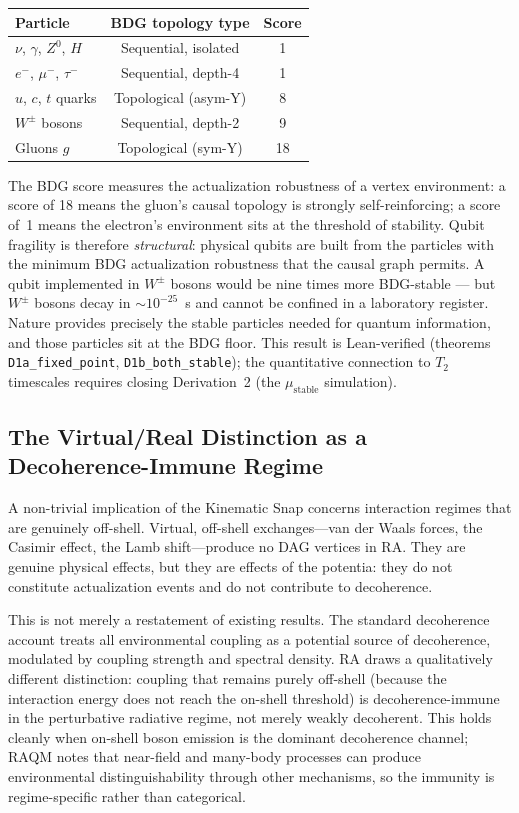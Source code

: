 \documentclass[11pt,a4paper]{article}
\theoremstyle{plain}
\theoremstyle{definition}
\theoremstyle{remark}
\begin{document}
\begin{center}
\renewcommand{\arraystretch}{1.2}
\begin{tabular}{lcc}
\toprule
Particle & BDG topology type & Score \\
\midrule
$\nu$, $\gamma$, $Z^0$, $H$ & Sequential, isolated & 1 \\
$e^-$, $\mu^-$, $\tau^-$ & Sequential, depth-4 & 1 \\
$u$, $c$, $t$ quarks & Topological (asym-Y) & 8 \\
$W^{\pm}$ bosons & Sequential, depth-2 & 9 \\
Gluons $g$ & Topological (sym-Y) & 18 \\
\bottomrule
\end{tabular}
\end{center}

The BDG score measures the actualization robustness of a vertex environment:
a score of 18 means the gluon's causal topology is strongly self-reinforcing;
a score of~1 means the electron's environment sits at the threshold of stability.
Qubit fragility is therefore \emph{structural}: physical qubits are built from
the particles with the minimum BDG actualization robustness that the causal
graph permits. A qubit implemented in $W^\pm$ bosons would be nine times more
BDG-stable --- but $W^\pm$ bosons decay in $\sim\!10^{-25}$~s and cannot be
confined in a laboratory register. Nature provides precisely the stable
particles needed for quantum information, and those particles sit at the BDG
floor. This result is Lean-verified (theorems \texttt{D1a\_fixed\_point},
\texttt{D1b\_both\_stable}); the quantitative connection to $T_2$ timescales
requires closing Derivation~2 (the $\mu_{\mathrm{stable}}$ simulation).

\subsection{The Virtual/Real Distinction as a Decoherence-Immune Regime}

A non-trivial implication of the Kinematic Snap concerns interaction regimes that
are genuinely off-shell. Virtual, off-shell exchanges---van der Waals forces,
the Casimir effect, the Lamb shift---produce no DAG vertices in RA. They are
genuine physical effects, but they are effects of the potentia: they do not
constitute actualization events and do not contribute to decoherence.

This is not merely a restatement of existing results. The standard decoherence
account treats all environmental coupling as a potential source of decoherence,
modulated by coupling strength and spectral density. RA draws a qualitatively
different distinction: coupling that remains purely off-shell (because the
interaction energy does not reach the on-shell threshold) is decoherence-immune
in the perturbative radiative regime, not merely weakly decoherent. This holds
cleanly when on-shell boson emission is the dominant decoherence channel;
RAQM notes that near-field and many-body processes can produce environmental
distinguishability through other mechanisms, so the immunity is regime-specific
rather than categorical.
\end{document}
